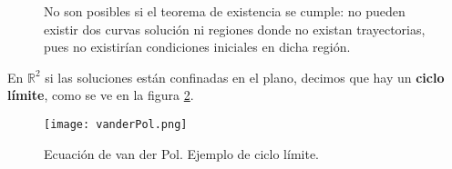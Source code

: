 \begin{figure}[ht]
    \centering
    \caption{No son posibles si el teorema de existencia se cumple: no pueden existir dos curvas solución ni regiones donde no existan trayectorias, pues no existirían condiciones iniciales en dicha región. }
    \label{fig:teun}
\end{figure}

\begin{tcolorbox}[colback=Black!4,colframe=White] 
\begin{nota}
  En $\mathbb{R}^2$ si las soluciones están confinadas en el plano, decimos que hay un \textbf{ciclo límite}, como se ve en la figura \ref{vander}.
  
\end{nota}
\end{tcolorbox}

\begin{figure}[H]
  \centering
  \texttt{[image: vanderPol.png]}
  \caption{Ecuación de van der Pol. Ejemplo de ciclo límite.}
  \label{vander}                                                
\end{figure}
